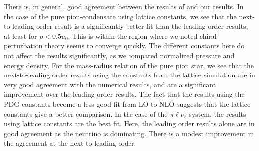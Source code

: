 There is, in general, good agreement between the results of \citeauthor{brandtNewClassCompact2018} and our results.
In the case of the pure pion-condensate using lattice constants, we see that the next-to-leading order result is a significantly better fit than the leading order results, at least for $p<0.5 u_0$.
This is within the region where we noted chiral perturbation theory seems to converge quickly.
The different constants here do not affect the results significantly, as we compared normalized pressure and energy density.
For the mass-radius relation of the pure pion star, we see that the next-to-leading order results using the constants from the lattice simulation are in very good agreement with the numerical results, and are a significant improvement over the leading order results.
The fact that the results using the PDG constants become a less good fit from LO to NLO suggests that the lattice constants give a better comparison.
In the case of the $\pi\ell\nu_\ell$-system, the results using lattice constants are the best fit.
Here, the leading order results alone are in good agreement as the neutrino is dominating.
There is a modest improvement in the agreement at the next-to-leading order.

\clearpage


